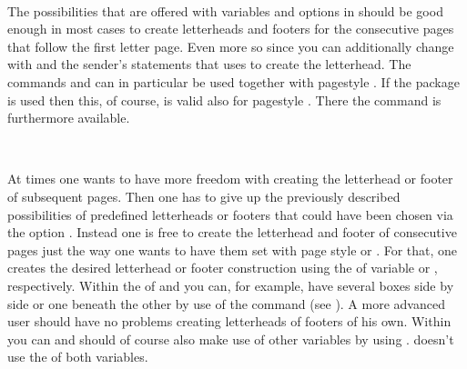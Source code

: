 \begin{Declaration}
  \\
\end{Declaration}
%
%
The possibilities that are offered with variables and options in
 should be good enough in most cases to create letterheads and
footers for the consecutive pages that follow the first letter page. Even more
so since you can additionally change with  and
 the sender's statements that  uses to create
the letterhead. The commands  and
 can in particular be used together with
pagestyle %
. If the package
 is used then this, of course, is
valid also for pagestyle
. There the command
 is furthermore available.

\begin{Declaration}
    \\
\end{Declaration}
%
%
At times one wants to have more freedom with creating the letterhead or footer
of subsequent pages. Then one has to give up the previously described
possibilities of predefined letterheads or footers that could have been chosen
via the option . Instead one is
free to create the letterhead and footer of consecutive pages just the way one
wants to have them set with page style
 or
.  For that, one creates the
desired letterhead or footer construction using the  of
variable  or
, respectively. Within the  of
 and  you can, for example, have several
boxes side by side or one beneath the other by use of the 
command (see \cite{latex:usrguide}). A more advanced user should have no
problems creating letterheads of footers of his own.  Within 
you can and should of course also make use of other variables by using
. \KOMAScript{} doesn't use the  of both
variables.

